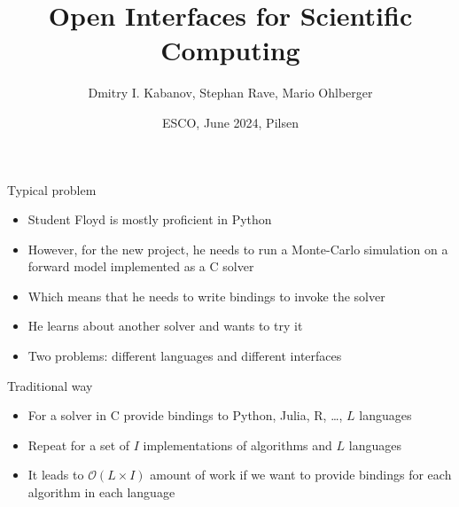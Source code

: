 \documentclass[10pt, aspectratio=169, progressbar=frametitle]{beamer}
\title{Open Interfaces for Scientific Computing}
\author{Dmitry I. Kabanov, Stephan Rave, Mario Ohlberger}
\institute{Institute for Analysis and Numerics, University of Münster}
\date{{\large ESCO, June 2024, Pilsen}}
\begin{document}
\maketitle

\begin{frame}{Typical problem}
  \begin{itemize}
    \item Student Floyd is mostly proficient in Python
    \item However, for the new project, he needs to run a Monte-Carlo
          simulation on a forward model implemented as a C solver
    \item Which means that he needs to write bindings to invoke the solver
    \item He learns about another solver and wants to try it
    \item \alert{Two problems:} different languages and different interfaces
  \end{itemize}
\end{frame}

\begin{frame}{Traditional way}
  \begin{minipage}{0.45\textwidth}
    \begin{itemize}
      \item For a solver in C provide bindings to Python, Julia, R, \dots, $L$ languages
      \item Repeat for a set of $I$ implementations of algorithms and $L$ languages
      \item It leads to $\mathcal O(L \times I)$ amount of work if we want to provide
            bindings for each algorithm in each language
    \end{itemize}
  \end{minipage}\hfill
  \begin{minipage}{0.45\textwidth}
    
  \end{minipage}
\end{frame}
\end{document}

